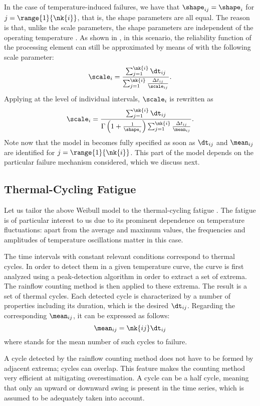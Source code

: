 In the case of temperature-induced failures, we have that $\shape_{ij} =
\shape_i$ for $j = \range{1}{\nk{i}}$, that is, the shape parameters are all
equal. The reason is that, unlike the scale parameters, the shape parameters are
independent of the operating temperature \cite{chang2006}. As shown in
\cite{xiang2010}, in this scenario, the reliability function of the processing
element can still be approximated by means of  with
the following scale parameter:
\[
  \scale_i = \frac{\sum_{j = 1}^{\nk{i}} \dt_{ij}}{\sum_{j = 1}^{\nk{i}} \frac{\Delta t_{ij}}{\scale_{ij}}}.
\]
Applying  at the level of individual intervals,
$\scale_i$ is rewritten as
\[
  \scale_i = \frac{\sum_{j = 1}^{\nk{i}} \dt_{ij}}{\Gamma\left(1 + \frac{1}{\shape_i}\right) \sum_{j = 1}^{\nk{i}} \frac{\Delta t_{ij}}{\mean_{ij}}}.
\]
Note now that the model in  becomes fully specified as
soon as $\dt_{ij}$ and $\mean_{ij}$ are identified for $j = \range{1}{\nk{i}}$.
This part of the model depends on the particular failure mechanism considered,
which we discuss next.

\subsection{Thermal-Cycling Fatigue}

Let us tailor the above Weibull model to the thermal-cycling fatigue
\cite{jedec2016}. The fatigue is of particular interest to us due to its
prominent dependence on temperature fluctuations: apart from the average and
maximum values, the frequencies and amplitudes of temperature oscillations
matter in this case.

The time intervals with constant relevant conditions correspond to thermal
cycles. In order to detect them in a given temperature curve, the curve is first
analyzed using a peak-detection algorithm in order to extract a set of extrema.
The rainflow counting method \cite{xiang2010} is then applied to these extrema.
The result is a set of  thermal cycles. Each detected cycle is
characterized by a number of properties including its duration, which is the
desired $\dt_{ij}$. Regarding the corresponding $\mean_{ij}$, it can be
expressed as follows:
\[
  \mean_{ij} = \nk{ij} \dt_{ij}
\]
where  stands for the mean number of such cycles to failure.

\begin{remark}
A cycle detected by the rainflow counting method does not have to be formed by
adjacent extrema; cycles can overlap. This feature makes the counting method
very efficient at mitigating overestimation. A cycle can be a half cycle,
meaning that only an upward or downward swing is present in the time series,
which is assumed to be adequately taken into account.
\end{remark}

